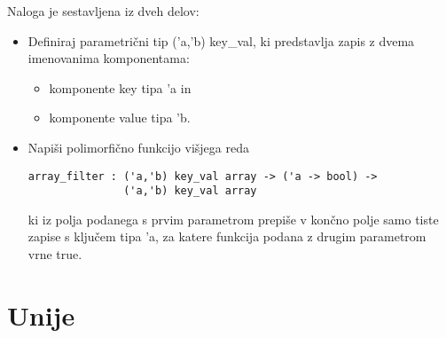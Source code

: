 \begin{ex}
  Naloga je sestavljena iz dveh delov:

\begin{itemize}
\item Definiraj parametri\v cni tip ('a,'b) key\_val, ki predstavlja
  zapis z dvema imenovanima komponentama:
  \begin{itemize}
  \item komponente key tipa 'a in
  \item komponente value tipa 'b.
  \end{itemize}
\item Napi\v si polimorfi\v cno funkcijo vi\v sjega reda

\begin{lstlisting}
array_filter : ('a,'b) key_val array -> ('a -> bool) ->  
               ('a,'b) key_val array
\end{lstlisting}

  ki iz polja podanega s prvim parametrom prepi\v se v kon\v cno polje
  samo tiste zapise s klju\v cem tipa 'a, za katere funkcija podana z
  drugim parametrom vrne true. \end{itemize}



\end{ex}


\section{Unije}

